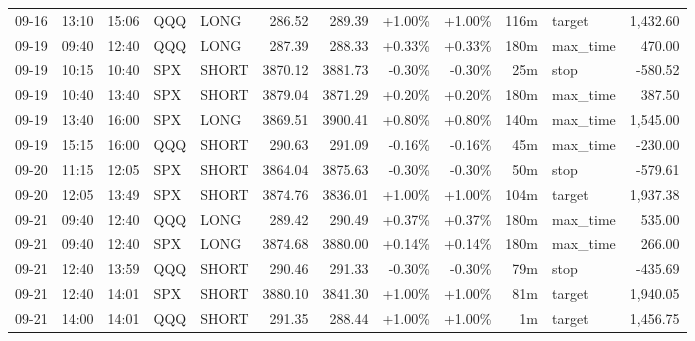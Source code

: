 \documentclass[11pt,a4paper,twoside]{article}
\begin{document}
\begin{center}
\begin{longtable}{>{\color{txtmain}}l l l l l r r r r r >{\color{txtmain}}l r}
09-16 & 13:10 & 15:06 & QQQ & LONG & 286.52 & 289.39 & \textcolor{wingreen}{+1.00\%} & \textcolor{wingreen}{+1.00\%} & 116m & target & \textcolor{wingreen}{1,432.60} \\
09-19 & 09:40 & 12:40 & QQQ & LONG & 287.39 & 288.33 & \textcolor{wingreen}{+0.33\%} & \textcolor{wingreen}{+0.33\%} & 180m & max\_time & \textcolor{wingreen}{470.00} \\
09-19 & 10:15 & 10:40 & SPX & SHORT & 3870.12 & 3881.73 & \textcolor{lossred}{-0.30\%} & \textcolor{lossred}{-0.30\%} & 25m & stop & \textcolor{lossred}{-580.52} \\
09-19 & 10:40 & 13:40 & SPX & SHORT & 3879.04 & 3871.29 & \textcolor{wingreen}{+0.20\%} & \textcolor{wingreen}{+0.20\%} & 180m & max\_time & \textcolor{wingreen}{387.50} \\
09-19 & 13:40 & 16:00 & SPX & LONG & 3869.51 & 3900.41 & \textcolor{wingreen}{+0.80\%} & \textcolor{wingreen}{+0.80\%} & 140m & max\_time & \textcolor{wingreen}{1,545.00} \\
09-19 & 15:15 & 16:00 & QQQ & SHORT & 290.63 & 291.09 & \textcolor{lossred}{-0.16\%} & \textcolor{lossred}{-0.16\%} & 45m & max\_time & \textcolor{lossred}{-230.00} \\
09-20 & 11:15 & 12:05 & SPX & SHORT & 3864.04 & 3875.63 & \textcolor{lossred}{-0.30\%} & \textcolor{lossred}{-0.30\%} & 50m & stop & \textcolor{lossred}{-579.61} \\
09-20 & 12:05 & 13:49 & SPX & SHORT & 3874.76 & 3836.01 & \textcolor{wingreen}{+1.00\%} & \textcolor{wingreen}{+1.00\%} & 104m & target & \textcolor{wingreen}{1,937.38} \\
09-21 & 09:40 & 12:40 & QQQ & LONG & 289.42 & 290.49 & \textcolor{wingreen}{+0.37\%} & \textcolor{wingreen}{+0.37\%} & 180m & max\_time & \textcolor{wingreen}{535.00} \\
09-21 & 09:40 & 12:40 & SPX & LONG & 3874.68 & 3880.00 & \textcolor{wingreen}{+0.14\%} & \textcolor{wingreen}{+0.14\%} & 180m & max\_time & \textcolor{wingreen}{266.00} \\
09-21 & 12:40 & 13:59 & QQQ & SHORT & 290.46 & 291.33 & \textcolor{lossred}{-0.30\%} & \textcolor{lossred}{-0.30\%} & 79m & stop & \textcolor{lossred}{-435.69} \\
09-21 & 12:40 & 14:01 & SPX & SHORT & 3880.10 & 3841.30 & \textcolor{wingreen}{+1.00\%} & \textcolor{wingreen}{+1.00\%} & 81m & target & \textcolor{wingreen}{1,940.05} \\
09-21 & 14:00 & 14:01 & QQQ & SHORT & 291.35 & 288.44 & \textcolor{wingreen}{+1.00\%} & \textcolor{wingreen}{+1.00\%} & 1m & target & \textcolor{wingreen}{1,456.75} \\

\end{longtable}
\end{center}
\end{document}
